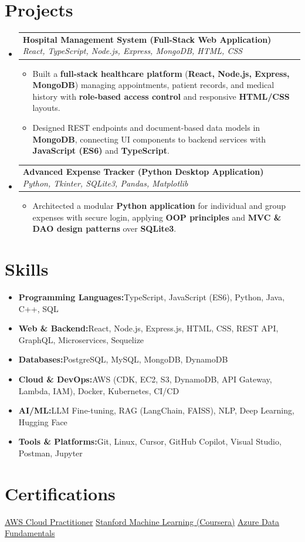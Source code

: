 \documentclass[a4paper,10pt]{article}
\makeatletter
\newcommand{\resumeItem}[2]{\item{\textbf{#1}{\hspace{0.5mm}#2 \vspace{-0.5mm}}}}
\newcommand{\resumeProject}[4]{
\vspace{0.3mm}\item
    \begin{tabular*}{0.98\textwidth}[t]{l@{\extracolsep{\fill}}r}
        \textbf{#1} \textbar{} \textit{\footnotesize{#2}} & \footnotesize{#4}
    \end{tabular*}\vspace{-2mm}
}
\newcommand{\resumeSubItem}[2]{\resumeItem{#1}{#2}\vspace{-3pt}}
\newcommand{\resumeSubHeadingListStart}{\begin{itemize}[leftmargin=*, labelsep=1mm]}
\newcommand{\resumeHeadingSkillStart}{\begin{itemize}[leftmargin=*, itemsep=0.6mm, rightmargin=2ex]}
\newcommand{\resumeItemListStart}{\begin{itemize}[leftmargin=*, labelsep=1mm, itemsep=0pt]}
\newcommand{\resumeSubHeadingListEnd}{\end{itemize}\vspace{1mm}}
\newcommand{\resumeHeadingSkillEnd}{\end{itemize}\vspace{-2mm}}
\newcommand{\resumeItemListEnd}{\end{itemize}\vspace{-2mm}}
\makeatother
\begin{document}
\section{\textbf{Projects}}
\resumeSubHeadingListStart

\resumeProject
{Hospital Management System (Full-Stack Web Application)}
{React, TypeScript, Node.js, Express, MongoDB, HTML, CSS}
{}
{}
\resumeItemListStart
\item \footnotesize{Built a \textbf{full-stack healthcare platform} (\textbf{React, Node.js, Express, MongoDB}) managing appointments, patient records, and medical history with \textbf{role-based access control} and responsive \textbf{HTML/CSS} layouts.}
\item \footnotesize{Designed REST endpoints and document-based data models in \textbf{MongoDB}, connecting UI components to backend services with \textbf{JavaScript (ES6)} and \textbf{TypeScript}.}
\resumeItemListEnd

\resumeProject
{Advanced Expense Tracker (Python Desktop Application)}
{Python, Tkinter, SQLite3, Pandas, Matplotlib}
{}
{}
\resumeItemListStart
\item \footnotesize{Architected a modular \textbf{Python application} for individual and group expenses with secure login, applying \textbf{OOP principles} and \textbf{MVC \& DAO design patterns} over \textbf{SQLite3}.}
\resumeItemListEnd

\resumeSubHeadingListEnd
\vspace{-4mm}

\section{\textbf{Skills}}
\resumeHeadingSkillStart
\resumeSubItem{Programming Languages:}{TypeScript, JavaScript (ES6), Python, Java, C++, SQL}
\resumeSubItem{Web \& Backend:}{React, Node.js, Express.js, HTML, CSS, REST API, GraphQL, Microservices, Sequelize}
\resumeSubItem{Databases:}{PostgreSQL, MySQL, MongoDB, DynamoDB}
\resumeSubItem{Cloud \& DevOps:}{AWS (CDK, EC2, S3, DynamoDB, API Gateway, Lambda, IAM), Docker, Kubernetes, CI/CD}
\resumeSubItem{AI/ML:}{LLM Fine-tuning, RAG (LangChain, FAISS), NLP, Deep Learning, Hugging Face}
\resumeSubItem{Tools \& Platforms:}{Git, Linux, Cursor, GitHub Copilot, Visual Studio, Postman, Jupyter}
\resumeHeadingSkillEnd
\vspace{0mm}

\section{\textbf{Certifications}}
\footnotesize{
\href{https://drive.google.com/file/d/1a3exoiS79RS3q8vSJHT-PpkczSPg54EZ/view}{AWS Cloud Practitioner} \hfill \href{https://drive.google.com/file/d/1At3BLkqJ9vuhPPUCcrNAw9yNH5li7XdQ/view}{Stanford Machine Learning (Coursera)} \hfill \href{https://drive.google.com/file/d/1VBJjfRMsIm8BckoUtLUV7ZbY88Jju2qT/view}{Azure Data Fundamentals}
}
\end{document}
